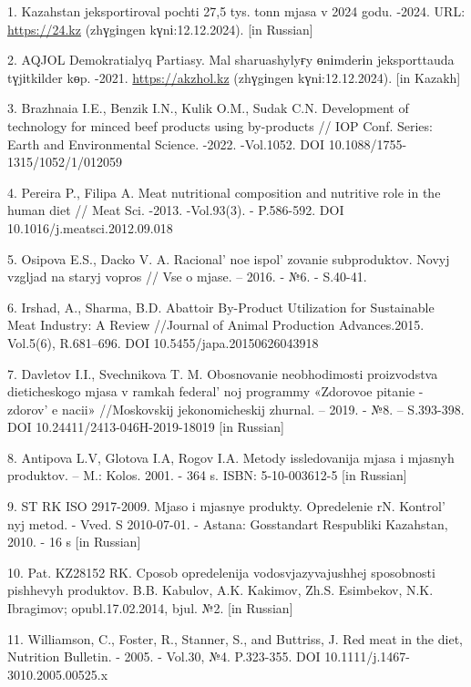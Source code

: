 \begin{references}
1. Kazahstan jeksportiroval pochti 27,5 tys. tonn mjasa v 2024
godu. -2024. URL:
\href{https://24.kz/ru/news/economyc/item/664590-kazakhstan-eksportiroval-pochti-27-5-tys-tonn-myasa-v-2024-godu}{https://24.kz}
(zhүgіngen kүnі:12.12.2024). {[}in Russian{]}

2. AQJOL Demokratialyq Partiasy. Mal sharuashylyғy өnіmderіn
jeksporttauda tүjіtkіlder kөp.
-2021. \href{https://akzhol.kz/index.php/kk/initiated-bills/mal-sharwashylyghy-oenimderin-eksporttawda-tuejtkilder-koep}{https://akzhol.kz}
(zhүgіngen kүnі:12.12.2024). {[}in Kazakh{]}

3. Brazhnaia I.E., Benzik I.N., Kulik O.M., Sudak C.N. Development of
technology for minced beef products using by-products // IOP Conf.
Series: Earth and Environmental Science. -2022. -Vol.1052. DOI
10.1088/1755-1315/1052/1/012059

4. Pereira P., Filipa A. Meat nutritional composition and nutritive role
in the human diet // Meat Sci. -2013. -Vol.93(3). - P.586-592. DOI
10.1016/j.meatsci.2012.09.018

5. Osipova E.S., Dacko V. A. Racional' noe
ispol' zovanie subproduktov. Novyj vzgljad na staryj
vopros // Vse o mjase. -- 2016. - №6. - S.40-41.

6. Irshad, A., Sharma, B.D. Abattoir By-Product Utilization for
Sustainable Meat Industry: A Review //Journal of Animal Production
Advances.2015. Vol.5(6), R.681--696. DOI 10.5455/japa.20150626043918

7. Davletov I.I., Svechnikova T. M. Obosnovanie neobhodimosti
proizvodstva dieticheskogo mjasa v ramkah federal' noj
programmy «Zdorovoe pitanie - zdorov' e nacii»
//Moskovskij jekonomicheskij zhurnal. -- 2019. - №8. -- S.393-398. DOI
10.24411/2413-046H-2019-18019 {[}in Russian{]}

8. Antipova L.V, Glotova I.A, Rogov I.A. Metody issledovanija mjasa i
mjasnyh produktov. -- M.: Kolos. 2001. - 364 s. ISBN: 5-10-003612-5
{[}in Russian{]}

9. ST RK ISO 2917-2009. Mjaso i mjasnye produkty. Opredelenie rN.
Kontrol' nyj metod. - Vved. S 2010-07-01. - Astana:
Gosstandart Respubliki Kazahstan, 2010. - 16 s {[}in Russian{]}

10. Pat. KZ28152 RK. Cposob opredelenija vodosvjazyvajushhej sposobnosti
pishhevyh produktov. B.B. Kabulov, A.K. Kakimov, Zh.S. Esimbekov, N.K.
Ibragimov; opubl.17.02.2014, bjul. №2. {[}in Russian{]}

11. Williamson, C., Foster, R., Stanner, S., and Buttriss, J. Red meat
in the diet, Nutrition Bulletin. - 2005. - Vol.30, №4. P.323-355.
DOI 10.1111/j.1467-3010.2005.00525.x


\end{references}
